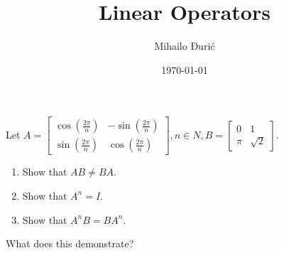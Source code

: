 \documentclass{article}
\title{Linear Operators}
\author{Mihailo Đurić}
\date{\today}
\begin{document}
\maketitle
\newpage

\begin{problem}
  Let $A = \begin{bmatrix} \cos(\frac{2 \pi}{n}) & -\sin(\frac{2 \pi}{n})\\ \sin(\frac{2 \pi}{n}) & \cos(\frac{2 \pi}{n}) \end{bmatrix}, n \in N, B = \begin{bmatrix} 0 & 1\\ \pi & \sqrt{2} \end{bmatrix}$.
  
  \begin{enumerate}[label=(\alph*)]
    \item Show that $AB \neq BA$.
    \item Show that $A^n = I$.
    \item Show that $A^nB = BA^n$.
  \end{enumerate}

  What does this demonstrate?
\end{problem}
\end{document}
